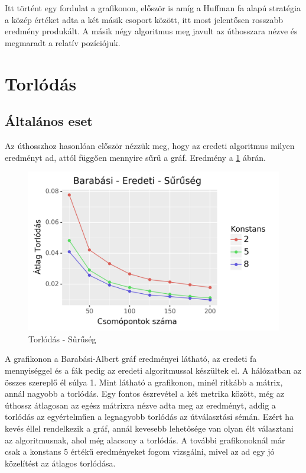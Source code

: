 \documentclass[12pt]{report}
\begin{document}
Itt történt egy fordulat a grafikonon, először is amíg a Huffman fa alapú stratégia a közép értéket adta a két másik csoport között, itt most jelentősen rosszabb eredmény produkált.
A másik négy algoritmus meg javult az úthosszara nézve és megmaradt a relatív pozíciójuk.

\section{Torlódás}

\subsection{Általános eset}

Az úthosszhoz hasonlóan először nézzük meg, hogy az eredeti algoritmus milyen eredményt ad, attól függően mennyire sűrű a gráf.
Eredmény a \ref{density-con} ábrán.

\begin{figure}[H]
	\begin{center}
		\includegraphics[width=0.9\linewidth]{pictures/density_con.png}
		\caption{Torlódás - Sűrűség}
		\label{density-con}
	\end{center}
\end{figure}

A grafikonon a Barabási-Albert gráf eredményei látható, az eredeti fa mennyiséggel és a fák pedig az eredeti algoritmussal készültek el.
A hálózatban az összes szereplő él súlya 1.
Mint látható a grafikonon, minél ritkább a mátrix, annál nagyobb a torlódás. 
Egy fontos észrevétel a két metrika között, még az úthossz átlagosan az egész mátrixra nézve adta meg az eredményt, addig a torlódás az egyértelműen a legnagyobb torlódás az útválasztási sémán.
Ezért ha kevés éllel rendelkezik a gráf, annál kevesebb lehetősége van olyan élt választani az algoritmusnak, ahol még alacsony a torlódás.
A további grafikonoknál már csak a konstans 5 értékű eredményeket fogom vizsgálni, mivel az ad egy jó közelítést az átlagos torlódása.
\end{document}
